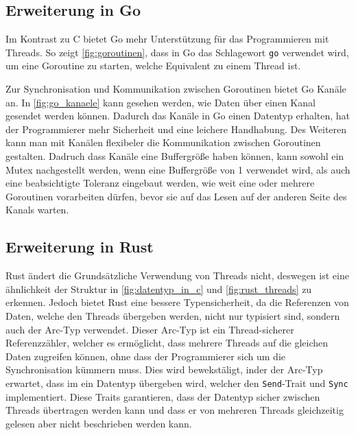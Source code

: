\subsection{Erweiterung in Go}
\label{subsec:Erweiterung in Go}
Im Kontrast zu C bietet Go mehr Unterstützung für das Programmieren mit Threads.
So zeigt \cref{fig:goroutinen}, dass in Go das Schlagewort \texttt{go} verwendet 
wird, um eine Goroutine zu starten, welche Equivalent zu einem Thread ist.

\begin{figure}[htp]
    \centering
    
\end{figure}

Zur Synchronisation und Kommunikation zwischen Goroutinen bietet Go
Kanäle an. In \cref{fig:go_kanaele} kann gesehen werden, wie Daten über einen 
Kanal gesendet werden können. Dadurch das Kanäle in Go einen Datentyp erhalten,
hat der Programmierer mehr Sicherheit und eine leichere Handhabung. Des Weiteren
kann man mit Kanälen flexibeler die Kommunikation zwischen Goroutinen gestalten.
Dadruch dass Kanäle eine Buffergröße haben können, kann sowohl ein Mutex 
nachgestellt werden, wenn eine Buffergröße von 1 verwendet wird, als auch eine 
beabsichtigte Toleranz eingebaut werden, wie weit eine oder mehrere Goroutinen 
vorarbeiten dürfen, bevor sie auf das Lesen auf der anderen Seite des Kanals 
warten. \autocite{hawthorneLanguageComparisonParallel}

\begin{figure}[htp]
    \centering
    
\end{figure}

\subsection{Erweiterung in Rust}
\label{subsec:Erweiterung in Rust}

Rust ändert die Grundsätzliche Verwendung von Threads nicht, deswegen ist eine 
ähnlichkeit der Struktur in \cref{fig:datentyp_in_c} und \cref{fig:rust_threads}
zu erkennen. Jedoch bietet Rust eine bessere Typensicherheit, da die Referenzen
von Daten, welche den Threads übergeben werden, nicht nur typisiert sind, sondern
auch der Arc-Typ verwendet. Dieser Arc-Typ ist ein Thread-sicherer 
Referenzzähler, welcher es ermöglicht, dass mehrere Threads auf die gleichen Daten
zugreifen können, ohne dass der Programmierer sich um die Synchronisation kümmern
muss. Dies wird bewekstäligt, inder der Arc-Typ erwartet, dass im ein Datentyp 
übergeben wird, welcher den \texttt{Send}-Trait und \texttt{Sync} implementiert. 
Diese Traits garantieren, dass der Datentyp sicher zwischen Threads 
übertragen werden kann und dass er von mehreren Threads gleichzeitig gelesen aber
nicht beschrieben werden kann.
\autocite{pfosiComparisonConcurrencyRust,IntroductionRustExample}

